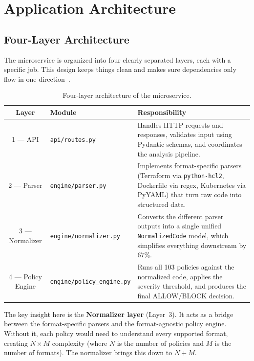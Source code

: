 \section{Application Architecture}
\label{sec:architecture}

\subsection{Four-Layer Architecture}

The microservice is organized into four clearly separated layers, each with a specific job. This design keeps things clean and makes sure dependencies only flow in one direction~\cite{martin2017cleanarch}.

\begin{table}[H]
\centering
\begin{tabularx}{\textwidth}{|c|l|X|}
\hline
\textbf{Layer} & \textbf{Module} & \textbf{Responsibility} \\
\hline
1 — API & \texttt{api/routes.py} & Handles HTTP requests and responses, validates input using Pydantic schemas, and coordinates the analysis pipeline. \\
\hline
2 — Parser & \texttt{engine/parser.py} & Implements format-specific parsers (Terraform via \texttt{python-hcl2}, Dockerfile via regex, Kubernetes via PyYAML) that turn raw code into structured data. \\
\hline
3 — Normalizer & \texttt{engine/normalizer.py} & Converts the different parser outputs into a single unified \texttt{NormalizedCode} model, which simplifies everything downstream by 67\%. \\
\hline
4 — Policy Engine & \texttt{engine/policy\_engine.py} & Runs all 103 policies against the normalized code, applies the severity threshold, and produces the final ALLOW/BLOCK decision. \\
\hline
\end{tabularx}
\caption{Four-layer architecture of the microservice.}
\label{tab:layers}
\end{table}

The key insight here is the \textbf{Normalizer layer} (Layer~3). It acts as a bridge between the format-specific parsers and the format-agnostic policy engine. Without it, each policy would need to understand every supported format, creating $N \times M$ complexity (where $N$ is the number of policies and $M$ is the number of formats). The normalizer brings this down to $N + M$.

